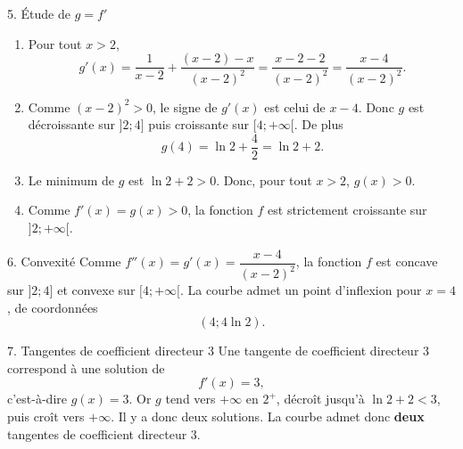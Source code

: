 \documentclass[11pt,a4paper]{article}
\begin{document}
\begin{correctionbox}{5. Étude de $g=f'$}
\begin{enumerate}
\item Pour tout $x>2$,
\[
g'(x)=\dfrac1{x-2}+\dfrac{(x-2)-x}{(x-2)^2}
=\dfrac{x-2-2}{(x-2)^2}
=\dfrac{x-4}{(x-2)^2}.
\]

\item Comme $(x-2)^2>0$, le signe de $g'(x)$ est celui de $x-4$. Donc $g$ est décroissante sur $]2;4]$ puis croissante sur $[4;+\infty[$.
De plus
\[
g(4)=\ln2+\dfrac42=\ln2+2.
\]

\begin{center}
\end{center}

\item Le minimum de $g$ est $\ln2+2>0$. Donc, pour tout $x>2$, $g(x)>0$.

\item Comme $f'(x)=g(x)>0$, la fonction $f$ est strictement croissante sur $]2;+\infty[$.
\end{enumerate}
\end{correctionbox}

\begin{correctionbox}{6. Convexité}
Comme $f''(x)=g'(x)=\dfrac{x-4}{(x-2)^2}$, la fonction $f$ est concave sur $]2;4]$ et convexe sur $[4;+\infty[$.
La courbe admet un point d'inflexion pour $x=4$, de coordonnées
\[
\boxed{(4;4\ln2)}.
\]
\end{correctionbox}

\begin{correctionbox}{7. Tangentes de coefficient directeur 3}
Une tangente de coefficient directeur $3$ correspond à une solution de
\[
f'(x)=3,
\]
c'est-à-dire $g(x)=3$. Or $g$ tend vers $+\infty$ en $2^+$, décroît jusqu'à $\ln2+2<3$, puis croît vers $+\infty$.
Il y a donc deux solutions. La courbe admet donc \textbf{deux} tangentes de coefficient directeur $3$.
\end{correctionbox}
\end{document}
